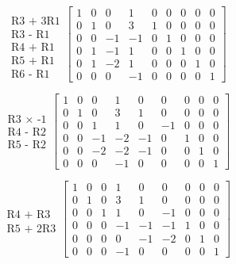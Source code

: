 \documentclass[]{article}
\begin{document}
\[
\begin{matrix}
\\
\text{R3 + 3R1}\\
\text{R3 - R1} \\
\text{R4 + R1} \\
\text{R5 + R1} \\
\text{R6 - R1}
\end{matrix}
\begin{bmatrix}
1  &  0  &  0  &  1  &  0  &  0  &  0  &  0  &  0 \\
0  &  1  &  0  &  3  &  1  &  0  &  0  &  0  &  0 \\
0  &  0  & -1  & -1  &  0  &  1  &  0  &  0  &  0 \\
0  &  1  & -1  &  1  &  0  &  0  &  1  &  0  &  0 \\
0  &  1  & -2  &  1  &  0  &  0  &  0  &  1  &  0 \\
0  &  0  &  0  & -1  &  0  &  0  &  0  &  0  &  1
\end{bmatrix}
\]

\[
\begin{matrix}
\\
\\
\text{R3 $\times$ -1} \\
\text{R4 - R2} \\
\text{R5 - R2} \\
\\
\end{matrix}
\begin{bmatrix}
1  &  0  &  0  &  1  &  0  &  0  &  0  &  0  &  0 \\
0  &  1  &  0  &  3  &  1  &  0  &  0  &  0  &  0 \\
0  &  0  &  1  &  1  &  0  & -1  &  0  &  0  &  0 \\
0  &  0  & -1  & -2  & -1  &  0  &  1  &  0  &  0 \\
0  &  0  & -2  & -2  & -1  &  0  &  0  &  1  &  0 \\
0  &  0  &  0  & -1  &  0  &  0  &  0  &  0  &  1
\end{bmatrix}
\]

\[
\begin{matrix}
\\
\\
\\
\text{R4 + R3} \\
\text{R5 + 2R3} \\
\\
\end{matrix}
\begin{bmatrix}
1  &  0  &  0  &  1  &  0  &  0  &  0  &  0  &  0 \\
0  &  1  &  0  &  3  &  1  &  0  &  0  &  0  &  0 \\
0  &  0  &  1  &  1  &  0  & -1  &  0  &  0  &  0 \\
0  &  0  &  0  & -1  & -1  & -1  &  1  &  0  &  0 \\
0  &  0  &  0  &  0  & -1  & -2  &  0  &  1  &  0 \\
0  &  0  &  0  & -1  &  0  &  0  &  0  &  0  &  1
\end{bmatrix}
\]
\end{document}

